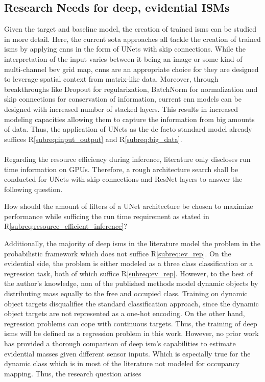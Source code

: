 \subsection{Research Needs for deep, evidential ISMs}
\label{subsec:research_needs_for_deep_isms}
Given the target and baseline model, the creation of trained \gls{ism}s can be studied in more detail. Here, the current \gls{sota} approaches all tackle the creation of trained \gls{ism}s by applying \gls{cnn}s in the form of UNets with skip connections. While the interpretation of the input varies between it being an image or some kind of multi-channel \gls{bev} grid map, \gls{cnn}s are an appropriate choice for they are designed to leverage spatial context from matrix-like data. Moreover, through breakthroughs like Dropout for regularization, BatchNorm for normalization and skip connections for conservation of information, current \gls{cnn} models can be designed with increased number of stacked layers. This results in increased modeling capacities allowing them to capture the information from big amounts of data. Thus, the application of UNets as the de facto standard model already suffices R\ref{subreq:input_output} and R\ref{subreq:big_data}.
\\\\
Regarding the resource efficiency during inference, literature only discloses run time information on GPUs. Therefore, a rough architecture search shall be conducted for UNets with skip connections and ResNet layers to answer the following question.
\\
\begin{requ} \label{requ:network_search}
	How should the amount of filters of a UNet architecture be chosen to maximize performance while sufficing the run time requirement as stated in R\ref{subreq:resource_efficient_inference}?
\end{requ}
Additionally, the majority of deep \gls{ism}s in the literature model the problem in the probabilistic framework which does not suffice R\ref{subreq:ev_rep}. On the evidential side, the problem is either modeled as a three class classification or a regression task, both of which suffice R\ref{subreq:ev_rep}. However, to the best of the author's knowledge, non of the published methods model dynamic objects by distributing mass equally to the free and occupied class. Training on dynamic object targets disqualifies the standard classification approach, since the dynamic object targets are not represented as a one-hot encoding. On the other hand, regression problems can cope with continuous targets. Thus, the training of deep \gls{ism}s will be defined as a regression problem in this work. However, no prior work has provided a thorough comparison of deep \gls{ism}'s capabilities to estimate evidential masses given different sensor inputs. Which is especially true for the dynamic class which is in most of the literature not modeled for occupancy mapping. Thus, the research question arises 
